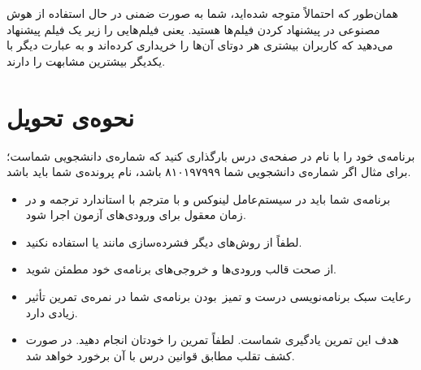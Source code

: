 \documentclass{utap}
\begin{document}
    همان‌طور که احتمالاً متوجه شده‌اید، شما به صورت ضمنی در حال استفاده از هوش مصنوعی در پیشنهاد کردن فیلم‌ها هستید. یعنی فیلم‌هایی را زیر یک فیلم پیشنهاد می‌دهید که کاربران بیشتری هر دوتای آن‌ها را خریداری کرده‌اند و به عبارت دیگر با یکدیگر بیشترین مشابهت را دارند.
    
    \section{نحوه‌ی تحویل}

    برنامه‌ی خود را با نام  در صفحه‌ی  درس بارگذاری کنید که  شماره‌ی دانشجویی شماست؛ برای مثال اگر شماره‌ی دانشجویی شما ۸۱۰۱۹۷۹۹۹ باشد، نام پرونده‌ی شما باید  باشد.

    \begin{itemize}
        \item برنامه‌ی شما باید در سیستم‌عامل لینوکس و با مترجم  با استاندارد  ترجمه و در زمان معقول برای ورودی‌های آزمون اجرا شود.
        \item لطفاً از روش‌های دیگر فشرده‌سازی مانند  یا  استفاده نکنید.
        \item از صحت قالب ورودی‌ها و خروجی‌های برنامه‌ی خود مطمئن شوید.
        \item رعایت سبک برنامه‌نویسی درست و تمیز~بودن برنامه‌ی شما در نمره‌ی تمرین تأثیر زیادی دارد.
        \item هدف این تمرین یادگیری شماست. لطفاً تمرین را خودتان انجام دهید. در صورت کشف تقلب مطابق قوانین درس با آن برخورد خواهد شد.
    \end{itemize}
\end{document}
